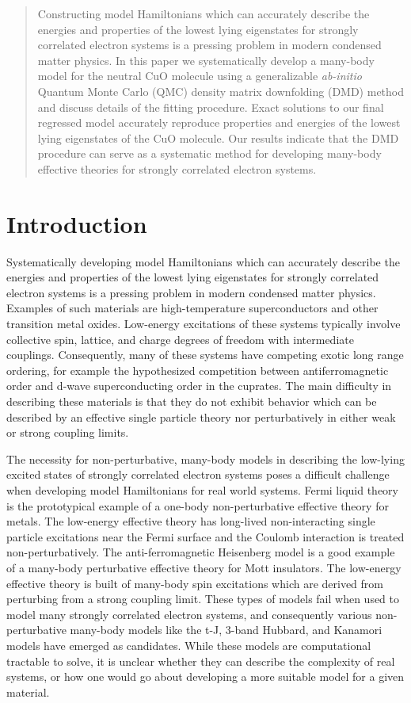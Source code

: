 \documentclass{article}
\begin{document}
\begin{abstract}
Constructing model Hamiltonians which can accurately describe the energies and properties of the lowest lying eigenstates for strongly correlated electron systems is a pressing problem in modern condensed matter physics.
In this paper we systematically develop a many-body model for the neutral CuO molecule using a generalizable \textit{ab-initio} Quantum Monte Carlo (QMC) density matrix downfolding (DMD) method and discuss details of the fitting procedure.
Exact solutions to our final regressed model accurately reproduce properties and energies of the lowest lying eigenstates of the CuO molecule.
Our results indicate that the DMD procedure can serve as a systematic method for developing many-body effective theories for strongly correlated electron systems.
\end{abstract}

\section{Introduction}
Systematically developing model Hamiltonians which can accurately describe the energies and properties of the lowest lying eigenstates for strongly correlated electron systems is a pressing problem in modern condensed matter physics. 
Examples of such materials are high-temperature superconductors and other transition metal oxides.
Low-energy excitations of these systems typically involve collective spin, lattice, and charge degrees of freedom with intermediate couplings.
Consequently, many of these systems have competing exotic long range ordering, for example the hypothesized competition between antiferromagnetic order and d-wave superconducting order in the cuprates.
The main difficulty in describing these materials is that they do not exhibit behavior which can be described by an effective single particle theory nor perturbatively in either weak or strong coupling limits.

The necessity for non-perturbative, many-body models in describing the low-lying excited states of strongly correlated electron systems poses a difficult challenge when developing model Hamiltonians for real world systems.
Fermi liquid theory is the prototypical example of a one-body non-perturbative effective theory for metals.
The low-energy effective theory has long-lived non-interacting single particle excitations near the Fermi surface and the Coulomb interaction is treated non-perturbatively.
The anti-ferromagnetic Heisenberg model is a good example of a many-body perturbative effective theory for Mott insulators.
The low-energy effective theory is built of many-body spin excitations which are derived from perturbing from a strong coupling limit.
These types of models fail when used to model many strongly correlated electron systems, and consequently various non-perturbative many-body models like the t-J, 3-band Hubbard, and Kanamori models have emerged as candidates.
While these models are computational tractable to solve, it is unclear whether they can describe the complexity of real systems, or how one would go about developing a more suitable model for a given material.
\end{document}
